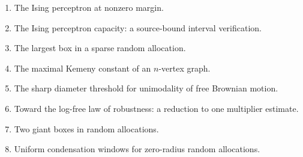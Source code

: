 \begin{enumerate}[label=\arabic*., itemsep=3pt, leftmargin=2.2em]
\item The Ising perceptron at nonzero margin.\\ 
\item The Ising perceptron capacity: a source-bound interval verification.\\ 
\item The largest box in a sparse random allocation.\\ 
\item The maximal Kemeny constant of an $n$-vertex graph.\\ 
\item The sharp diameter threshold for unimodality of free Brownian motion.\\ 
\item Toward the log-free law of robustness: a reduction to one multiplier estimate.\\ 
\item Two giant boxes in random allocations.\\ 
\item Uniform condensation windows for zero-radius random allocations.\\ 
\end{enumerate}
